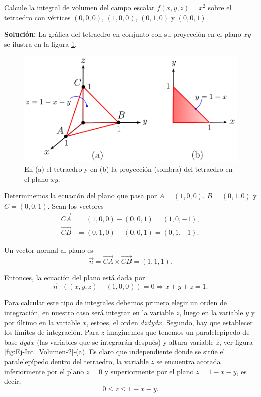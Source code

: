 \begin{ejemplo}
    Calcule la integral de volumen del campo escalar $f(x,y,z) = x^2$ sobre el tetraedro con vértices $(0,0,0)$, $(1,0,0)$, $(0,1,0)$ y $(0,0,1)$.

    \textbf{Solución:} La gráfica del tetraedro en conjunto con su proyección en el plano $xy$ se ilustra en la figura \ref{fig:Ej-Int_Volumen}.

    \begin{figure}[H]
        \centering
        \includegraphics[scale = 0.7]{Figuras/Ej-Integral-Volumen.pdf}
        \caption{En (a) el tetraedro y en (b) la proyección (sombra) del tetraedro en el plano $xy$.}
        \label{fig:Ej-Int_Volumen}
    \end{figure}

    Determinemos la ecuación del plano que pasa por $A = (1,0,0)$, $B = (0,1,0)$ y $C = (0,0,1)$. Sean los vectores
    \begin{align*}
        \overrightarrow{CA} &= (1,0,0) - (0,0,1) = (1,0,-1), \\
        \overrightarrow{CB} &= (0,1,0) - (0,0,1) = (0,1,-1).
    \end{align*}

    Un vector normal al plano es
    $$\Vec{n} = \overrightarrow{CA} \times  \overrightarrow{CB} = (1,1,1).$$

    Entonces, la ecuación del plano está dada por
    $$\Vec{n} \cdot ( (x,y,z) - (1,0,0)) = 0 \Rightarrow x + y + z = 1.$$
    
    Para calcular este tipo de integrales debemos primero elegir un orden de integración, en nuestro caso será integrar en la variable $z$, luego en la variable $y$ y por último en la variable $x$, estoes, el orden $dzdydx$. Segundo, hay que establecer los límites de integración. Para $z$ imaginemos que tenemos un paralelepípedo de base $dydx$ (las variables que se integrarán después) y altura variable $z$, ver figura \ref{fig:Ej-Int_Volumen-2}-(a). Es claro que independiente donde se sitúe el paralelepípedo dentro del tetraedro, la variable $z$ se encuentra acotada inferiormente por el plano $z = 0$ y superiormente por el plano $z = 1 - x -y$, es decir,
    $$0 \leq z \leq 1-x-y.$$


\end{ejemplo}
